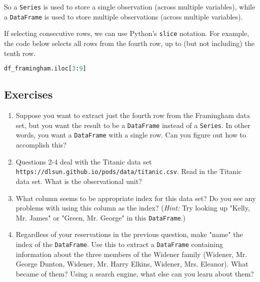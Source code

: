 So a \verb|Series| is used to store a single observation (across multiple variables), while a \verb|DataFrame| is used to store multiple observations (across multiple variables).



If selecting consecutive rows, we can use Python's \verb|slice| notation. For example, the code below selects all rows from the fourth row, up to (but not including) the tenth row.

\begin{lstlisting}[language=Python]
df_framingham.iloc[3:9]
\end{lstlisting}




\subsection{Exercises}\label{1.2.2}


\begin{enumerate}
\item 
Suppose you want to extract just the fourth row from the Framingham data set, but you want the result to be a \verb|DataFrame| instead of a \verb|Series|. In other words, you want a \verb|DataFrame| with a single row. Can you figure out how to accomplish this?

\item 
Questions 2-4 deal with the Titanic data set \verb|https://dlsun.github.io/pods/data/titanic.csv|. Read in the Titanic data set. What is the observational unit?

\item 
What column seems to be appropriate index for this data set? Do you see any problems with using this column as the index? (\textit{Hint:} Try looking up "Kelly, Mr. James" or "Green, Mr. George" in this \verb|DataFrame|.)

\item 
Regardless of your reservations in the previous question, make "name" the index of the \verb|DataFrame|. Use this to extract a \verb|DataFrame| containing information about the three members of the Widener family (Widener, Mr. George Dunton, Widener, Mr. Harry Elkins, Widener, Mrs. Eleanor). What became of them? Using a search engine, what else can you learn about them?

\end{enumerate}

\begin{lstlisting}[language=Python]

\end{lstlisting}







